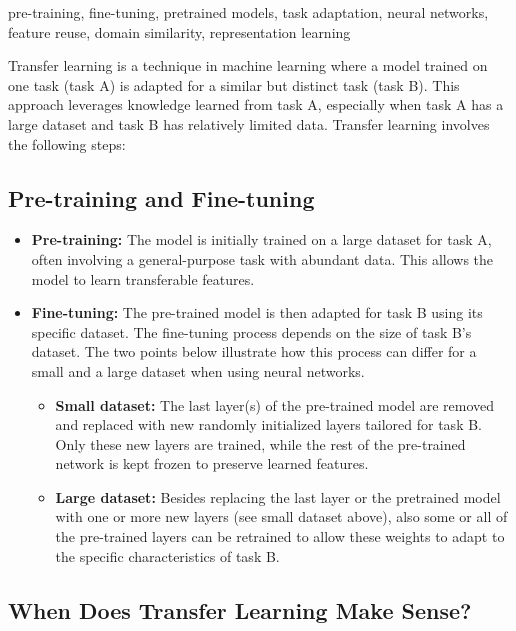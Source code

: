 \documentclass[12pt,openany]{book}
\begin{document}
\begin{keywordsbox}
pre-training, fine-tuning, pretrained models, task adaptation, neural networks, feature reuse, domain similarity, representation learning
\end{keywordsbox}

Transfer learning is a technique in machine learning where a model trained on one task (task A) is adapted for a similar but distinct task (task B). This approach leverages knowledge learned from task A, especially when task A has a large dataset and task B has relatively limited data. Transfer learning involves the following steps:


\subsection{Pre-training and Fine-tuning}

\begin{itemize}
    \item \textbf{Pre-training:} The model is initially trained on a large dataset for task A, often involving a general-purpose task with abundant data. This allows the model to learn transferable features.
    \item \textbf{Fine-tuning:} The pre-trained model is then adapted for task B using its specific dataset. The fine-tuning process depends on the size of task B’s dataset. The two points below illustrate how this process can differ for a small and a large dataset when using neural networks.
    \begin{itemize}
        \item \textbf{Small dataset:} The last layer(s) of the pre-trained model are removed and replaced with new randomly initialized layers tailored for task B. Only these new layers are trained, while the rest of the pre-trained network is kept frozen to preserve learned features.
        \item \textbf{Large dataset:} Besides replacing the last layer or the pretrained model with one or more new layers (see small dataset above), also some or all of the pre-trained layers can be retrained to allow these weights to adapt to the specific characteristics of task B.
    \end{itemize}
\end{itemize}


\subsection{When Does Transfer Learning Make Sense?}
\end{document}
